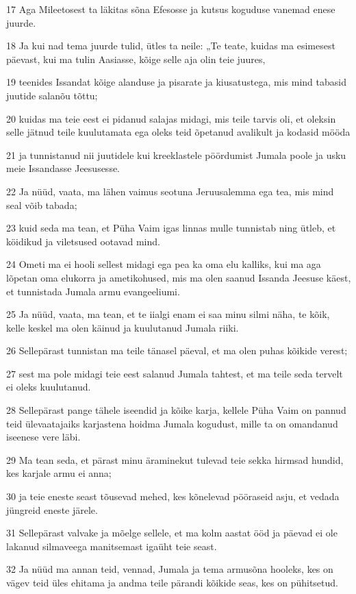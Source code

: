 \par 17 Aga Mileetosest ta läkitas sõna Efesosse ja kutsus koguduse vanemad enese juurde.
\par 18 Ja kui nad tema juurde tulid, ütles ta neile: „Te teate, kuidas ma esimesest päevast, kui ma tulin Aasiasse, kõige selle aja olin teie juures,
\par 19 teenides Issandat kõige alanduse ja pisarate ja kiusatustega, mis mind tabasid juutide salanõu tõttu;
\par 20 kuidas ma teie eest ei pidanud salajas midagi, mis teile tarvis oli, et oleksin selle jätnud teile kuulutamata ega oleks teid õpetanud avalikult ja kodasid mööda
\par 21 ja tunnistanud nii juutidele kui kreeklastele pöördumist Jumala poole ja usku meie Issandasse Jeesusesse.
\par 22 Ja nüüd, vaata, ma lähen vaimus seotuna Jeruusalemma ega tea, mis mind seal võib tabada;
\par 23 kuid seda ma tean, et Püha Vaim igas linnas mulle tunnistab ning ütleb, et köidikud ja viletsused ootavad mind.
\par 24 Ometi ma ei hooli sellest midagi ega pea ka oma elu kalliks, kui ma aga lõpetan oma elukorra ja ametikohused, mis ma olen saanud Issanda Jeesuse käest, et tunnistada Jumala armu evangeeliumi.
\par 25 Ja nüüd, vaata, ma tean, et te iialgi enam ei saa minu silmi näha, te kõik, kelle keskel ma olen käinud ja kuulutanud Jumala riiki.
\par 26 Sellepärast tunnistan ma teile tänasel päeval, et ma olen puhas kõikide verest;
\par 27 sest ma pole midagi teie eest salanud Jumala tahtest, et ma teile seda tervelt ei oleks kuulutanud.
\par 28 Sellepärast pange tähele iseendid ja kõike karja, kellele Püha Vaim on pannud teid ülevaatajaiks karjastena hoidma Jumala kogudust, mille ta on omandanud iseenese vere läbi.
\par 29 Ma tean seda, et pärast minu äraminekut tulevad teie sekka hirmsad hundid, kes karjale armu ei anna;
\par 30 ja teie eneste seast tõusevad mehed, kes kõnelevad pööraseid asju, et vedada jüngreid eneste järele.
\par 31 Sellepärast valvake ja mõelge sellele, et ma kolm aastat ööd ja päevad ei ole lakanud silmaveega manitsemast igaüht teie seast.
\par 32 Ja nüüd ma annan teid, vennad, Jumala ja tema armusõna hooleks, kes on vägev teid üles ehitama ja andma teile pärandi kõikide seas, kes on pühitsetud.
